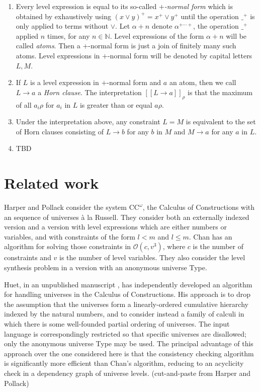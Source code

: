\documentclass[11pt,a4paper]{article}
\def\Ordo{\mathcal{O}}
\def\CComega{\mathrm{CC}^\omega}
\newcommand{\sct}[1]{[\![#1]\!]}
\begin{document}
\begin{enumerate}
\item Every level expression is equal to its so-called
\emph{$+$-normal form} which is obtained by exhaustively using 
$(x\vee y)^+ = x^+ \vee y^+$ until the operation $\_^+$ is only applied
to terms without $\vee$. Let $\alpha+n$ denote $\alpha^{+\cdots+}$, the
operation $\_^+$ applied $n$ times, for any $n\in\mathbb{N}$.
Level expressions of the form $\alpha+n$ will be called \emph{atoms}.
Then a $+$-normal form is just a join of finitely many such atoms.
Level expressions in $+$-normal form will be denoted by capital letters $L,M$.

\item If $L$ is a level expression in $+$-normal form and $a$ an atom,
then we call $L\to a$ a \emph{Horn clause}. The interpretation $\sct{L\to a}_\rho$
is that the maximum of all $a_i\rho$ for $a_i$ in $L$ is greater than or equal $a\rho$.

\item Under the interpretation above, any constraint $L=M$ is
equivalent to the set of Horn clauses consisting of $L\to b$ for any $b$ in $M$
and $M\to a$ for any $a$ in $L$.

\item TBD

\end{enumerate}

\section{Related work}

Harper and Pollack \cite{HarperP91} consider the system $\CComega$, the Calculus of Constructions with an sequence of universes \`a la Russell. They consider both an externally indexed version and a version with level expressions which are either numbers or variables, and with constraints of the form $l < m$ and $l \leq m$. Chan has an algorithm for solving those constraints in $\Ordo(c,v^3)$, where $c$ is the number of constraints and $v$ is the number of level variables. They also consider the level synthesis problem in a version with an anonymous universe Type.

Huet, in an unpublished manuscript \cite{Huet87}, has independently developed an
algorithm for handling universes in the Calculus of Constructions. His approach is to drop the assumption that the universes form a linearly-ordered
cumulative hierarchy indexed by the natural numbers, and to consider instead a family of calculi in which there is some well-founded partial ordering
of universes. The input language is correspondingly restricted so that specific universes are disallowed; only the anonymous universe Type may be
used. The principal advantage of this approach over the one considered here
is that the consistency checking algorithm is significantly more efficient than
Chan's algorithm, reducing to an acyclicity check in a dependency graph of
universe levels. (cut-and-paste from Harper and Pollack)
\end{document}
